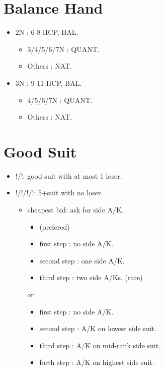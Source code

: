 \documentclass[12pt,twoside,a5paper]{report}%
\begin{document}
	\section*{Balance Hand}
		\begin{itemize}
		\renewcommand{\labelitemi}{}
			\item 2N : 6-8 HCP, BAL.
				\begin{itemize}
				\renewcommand{\labelitemi}{--}
					\item 3/4/5/6/7N : QUANT.
					\item Others : NAT.
				\end{itemize}
			\item 3N : 9-11 HCP, BAL.
				\begin{itemize}
				\renewcommand{\labelitemi}{--}
					\item 4/5/6/7N : QUANT.
					\item Others : NAT.
				\end{itemize}
		\end{itemize}
	\section*{Good Suit}
		\begin{itemize}
		\renewcommand{\labelitemi}{}
			\item {}!/\sp{}!: good suit with at most 1 loser.
			\item {}!/\di{}!/\he{}!/\sp{}!: 5+suit with no loser.
			\begin{itemize}
			\renewcommand{\labelitemi}{--}
			\item cheapest bid: ask for side A/K.
				\begin{itemize}
				\renewcommand{\labelitemi}{--}
					\item (prefered)
					\item first step : no side A/K.
					\item second step : one side A/K.
					\item third step : two side A/Ks. (rare)			
				\end{itemize}
				or
				\begin{itemize}
				\renewcommand{\labelitemi}{--}
					\item first step : no side A/K.
					\item second step : A/K on lowest side suit.
					\item third step : A/K on mid-rank side suit.
					\item forth step : A/K on highest side suit. 
				\end{itemize}
				
			\end{itemize}
		\end{itemize}
\end{document}
